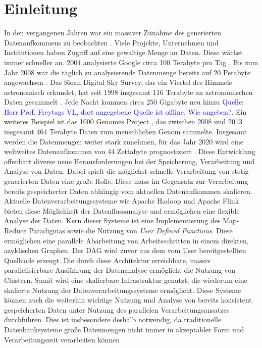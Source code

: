 \chapter{Einleitung}
In den vergangenen Jahren war ein massiver Zunahme des generierten Datenaufkommens zu beobachten \cite{EMC2014}. Viele Projekte, Unternehmen und Institutionen haben Zugriff auf eine gewaltige Menge an Daten. Diese wächst immer schneller an. 2004 analysierte Google circa 100 Terabyte pro Tag \cite{Dean2004}. Bis zum Jahr 2008 war die täglich zu analysierende Datenmenge bereits auf 20 Petabyte angewachsen \cite{Dean2008}. Das Sloan Digital Sky Survey, das ein Viertel des Himmels astronomisch erkundet, hat seit 1998 insgesamt 116 Terabyte an astronomischen Daten gesammelt \cite{York2000, Alam2015}. Jede Nacht kommen circa 250 Gigabyte neu hinzu \textcolor{blue}{Quelle: Herr Prof. Freytags VL, dort angegebene Quelle ist offline. Wie angeben?}. Ein weiteres Beispiel ist das 1000 Genomes Project \cite{Baker2010}, das zwischen 2008 und 2013 insgesamt 464 Terabyte Daten zum menschlichen Genom sammelte. Insgesamt werden die Datenmengen weiter stark zunehmen, für das Jahr 2020 wird eine weltweites Datenaufkommen von 44 Zettabyte prognostiziert \cite{EMC2014}. 
Diese Entwicklung offenbart diverse neue Herausforderungen bei der Speicherung, Verarbeitung und Analyse von Daten. Dabei spielt die möglichst schnelle Verarbeitung von stetig generierten Daten eine große Rolle. Diese muss im Gegensatz zur Verarbeitung bereits gespeicherter Daten abhängig vom aktuellen Datenaufkommen skalieren. Aktuelle Datenverarbeitungssysteme wie Apache Hadoop \cite{HadoopWebsite} und Apache Flink \cite{FlinkWebsite} bieten diese Möglichkeit der Datenflussanalyse und ermöglichen eine flexible Analyse der Daten. Kern dieser Systeme ist eine Implementierung des Map-Reduce Paradigmas \cite{Dean2008} sowie die Nutzung von \textit{User Defined Functions}. Diese ermöglichen eine parallele Abarbeitung von Arbeitsschritten in einem direkten, azyklischen Graphen. Der DAG wird zuvor aus dem vom User bereitgestellten Quellcode erzeugt. Die durch diese Architektur erreichbare, massiv parallelisierbare Ausführung der Datenanalyse ermöglicht die Nutzung von Clustern. Somit wird eine skalierbare Infrastruktur genutzt, die wiederum eine skalierte Nutzung der Datenverarbeitungssysteme ermöglicht. Diese Systeme können auch die weiterhin wichtige Nutzung und Analyse von bereits konsistent gespeicherten Daten unter Nutzung des parallelen Verarbeitungsansatzes durchführen. Dies ist insbesondere deshalb notwendig, da traditionelle Datenbanksysteme große Datenmengen nicht immer in akzeptabler Form und Verarbeitungszeit verarbeiten können \cite{Jacobs2009}.
